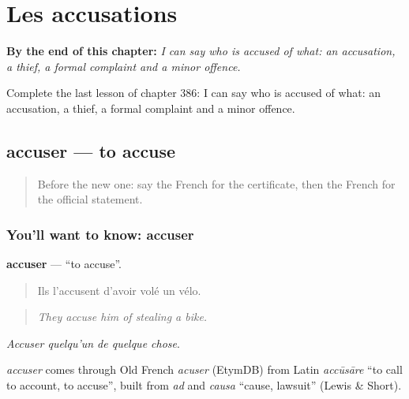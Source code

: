 
\chapter{Les accusations}
\label{ch:fr-les-accusations}

\begin{chapteropening}
\textbf{By the end of this chapter:} \emph{I can say who is accused of what: an accusation, a thief, a formal complaint and a minor offence.}

Complete the last lesson of chapter 386: I can say who is accused of what: an accusation, a thief, a formal complaint and a minor offence.
\end{chapteropening}

\section[accuser]{accuser — to accuse}

\label{lesson:FR-C386-accuser}



\begin{quote}
Before the new one: say the French for the certificate, then the French for the official statement.
\end{quote}

\subsection*{You'll want to know: accuser}
\textbf{accuser} — \textquotedblleft{}to accuse\textquotedblright{}.

\begin{quote}
Ils l'accusent d'avoir volé un vélo.
\end{quote}

\begin{quote}
\emph{They accuse him of stealing a bike.}
\end{quote}

\emph{Accuser quelqu'un de quelque chose}.

\begin{cousinweb}
\emph{accuser} comes through Old French \emph{acuser} (EtymDB) from Latin \emph{accūsāre} \textquotedblleft{}to call to account, to accuse\textquotedblright{}, built from \emph{ad} and \emph{causa} \textquotedblleft{}cause, lawsuit\textquotedblright{} (Lewis \& Short).
\end{cousinweb}

